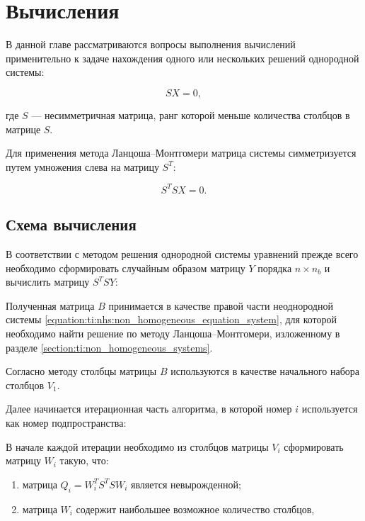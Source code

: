 \chapter{Вычисления} \label{chapter:computations}

В данной главе рассматриваются вопросы выполнения вычислений применительно к задаче нахождения одного или нескольких решений однородной системы:

$$
	S X = 0,
$$

где $S$ --- несимметричная матрица, ранг которой меньше количества столбцов в матрице $S$.

Для применения метода Ланцоша--Монтгомери матрица системы симметризуется путем умножения слева на матрицу $S^T$:

$$
	S^T S X = 0.
$$

\section{Схема вычисления} \label{section:computational_scheme}

В соответствии с методом решения однородной системы уравнений прежде всего необходимо сформировать случайным образом матрицу $Y$ порядка $n \times n_b$ и вычислить
матрицу $S^T S Y$:


Полученная матрица $B$ принимается в качестве правой части неоднородной системы \ref{equation:ti:nhs:non_homogeneous_equation_system},
для которой необходимо найти решение по методу Ланцоша--Монтгомери, изложенному в разделе \ref{section:ti:non_homogeneous_systems}.

Согласно методу столбцы матрицы $B$ используются в качестве начального набора столбцов $V_1$.


Далее начинается итерационная часть алгоритма, в которой номер $i$ используется как номер подпространства:


В начале каждой итерации необходимо из столбцов матрицы $V_i$ сформировать матрицу $W_i$ такую, что:

\begin{enumerate}
	\item матрица $Q_i = W_i^T S^T S W_i$ является невырожденной;
	\item матрица $W_i$ содержит наибольшее возможное количество столбцов,
\end{enumerate}

